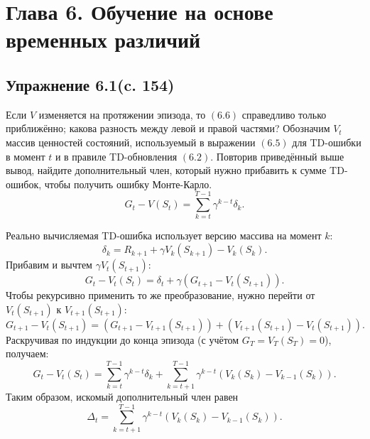 \section{Глава 6. Обучение на основе временных различий}

\subsection{Упражнение 6.1(c. 154)}
Если $V$ изменяется на протяжении эпизода, то $(6.6)$ справедливо только приближённо; какова разность между левой и правой частями? Обозначим $V_t$ массив ценностей состояний, используемый в выражении $(6.5)$ для TD-ошибки в момент $t$ и в правиле TD-обновления $(6.2)$. Повторив приведённый выше вывод, найдите дополнительный член, который нужно прибавить к сумме TD-ошибок, чтобы получить ошибку Монте-Карло.
\begin{equation}
    G_t - V(S_t) = \sum_{k=t}^{T-1} \gamma^{k-t} \delta_k.
    \tag{6.6}
\end{equation}
\begin{solution}
    Реально вычисляемая TD-ошибка использует версию массива на момент $k$:
    \[
    \delta_k = R_{k+1} + \gamma V_k(S_{k+1}) - V_k(S_k).
    \]
    Прибавим и вычтем $\gamma V_t(S_{t+1})$:
    \[
    G_t - V_t(S_t) = \delta_t + \gamma\left(G_{t+1} - V_t(S_{t+1})\right).
    \]
    Чтобы рекурсивно применить то же преобразование, нужно перейти от $V_t(S_{t+1})$ к $V_{t+1}(S_{t+1})$:
    \[
    G_{t+1} - V_t(S_{t+1}) = \left(G_{t+1} - V_{t+1}(S_{t+1})\right) + \left(V_{t+1}(S_{t+1}) - V_t(S_{t+1})\right).
    \]
    Раскручивая по индукции до конца эпизода (с учётом $G_T = V_T(S_T) = 0$), получаем:
    \[
    G_t - V_t(S_t) = \sum_{k=t}^{T-1} \gamma^{k-t} \delta_k + \sum_{k=t+1}^{T-1} \gamma^{k-t} \left(V_k(S_k) - V_{k-1}(S_k)\right).
    \]
    Таким образом, искомый дополнительный член равен
    \[
    \Delta_t = \sum_{k=t+1}^{T-1} \gamma^{k-t} \left(V_k(S_k) - V_{k-1}(S_k)\right). 
    \]
\end{solution}


